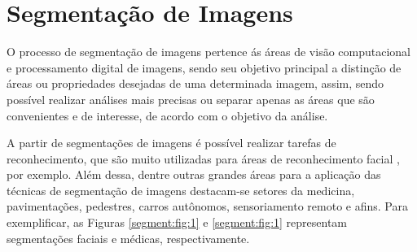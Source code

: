 \newpage
\clearpage
\section{Segmentação de Imagens}
\label{segment:image}

O processo de segmentação de imagens pertence ás áreas de visão computacional e processamento digital de imagens, sendo seu objetivo principal a distinção de áreas ou propriedades desejadas \cite{Haralick1985, Yuheng2017, Ghosh2019} de uma determinada imagem, assim, sendo possível realizar análises mais precisas ou separar apenas as áreas que são convenientes e de interesse, de acordo com o objetivo da análise.

A partir de segmentações de imagens é possível realizar tarefas de reconhecimento, que são muito utilizadas para áreas de reconhecimento facial \cite{Yuheng2017}, por exemplo. Além dessa, dentre outras grandes áreas para a aplicação das técnicas de segmentação de imagens destacam-se setores da medicina, pavimentações, pedestres, carros autônomos, sensoriamento remoto e afins. Para exemplificar, as Figuras \ref{segment:fig:1} e \ref{segment:fig:1} representam segmentações faciais e médicas, respectivamente.  

